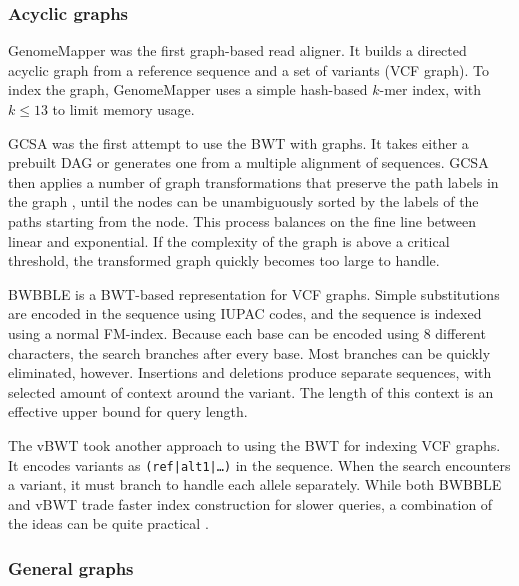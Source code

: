 \subsubsection{Acyclic graphs}

GenomeMapper \cite{Schneeberger_2009} was the first graph-based read aligner.
It builds a directed acyclic graph from a reference sequence and a set of variants (VCF graph).
To index the graph, GenomeMapper uses a simple hash-based $k$-mer index, with $k \le 13$ to limit memory usage.

GCSA \cite{Siren_2014} was the first attempt to use the BWT with graphs.
It takes either a prebuilt DAG or generates one from a multiple alignment of sequences.
GCSA then applies a number of graph transformations that preserve the path labels in the graph , until the nodes can be unambiguously sorted by the labels of the paths starting from the node.
This process balances on the fine line  between linear and exponential.
If the complexity of the graph is above a critical threshold, the transformed graph quickly becomes too large to handle.

BWBBLE \cite{Huang_2013} is a BWT-based representation for VCF graphs.
Simple substitutions are encoded in the sequence using IUPAC codes, and the sequence is indexed using a normal FM-index.
Because each base can be encoded using 8 different characters, the search branches after every base.
Most branches can be quickly eliminated, however.
Insertions and deletions produce separate sequences, with selected amount of context around the variant.
The length of this context is an effective upper bound for query length.

The vBWT \cite{Maciuca_2016} took another approach to using the BWT for indexing VCF graphs.
It encodes variants as \texttt{(ref|alt1|\dots)} in the sequence.
When the search encounters a variant, it must branch to handle each allele separately.
While both BWBBLE and vBWT trade faster index construction for slower queries, a combination of the ideas can be quite practical \cite{Buechler_2019}.

\subsubsection{General graphs}

